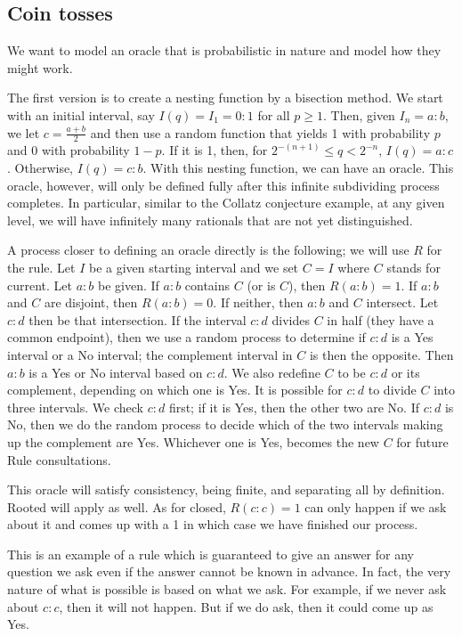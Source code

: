 \documentclass[12pt]{article}
\theoremstyle{remark}
\begin{document}
\subsection{Coin tosses}

We want to model an oracle that is probabilistic in nature and model how they might work. 

The first version is to create a nesting function by a bisection method. We start with an initial interval, say $I(q) = I_1 = 0:1$ for all $p\geq 1$. Then, given $I_n = a:b$, we let $c = \tfrac{a+b}{2}$ and then use a random function that yields 1 with probability $p$ and 0 with probability $1-p$. If it is 1, then, for $2^{-(n+1)} \leq q  < 2^{-n}$, $I(q) = a:c$. Otherwise, $I(q) = c:b$. With this nesting function, we can have an oracle. This oracle, however, will only be defined fully after this infinite subdividing process completes. In particular, similar to the Collatz conjecture example, at any given level, we will have infinitely many rationals that are not yet distinguished.  

A process closer to defining an oracle directly is the following; we will use $R$ for the rule. Let $I$ be a given starting interval and we set $C=I$ where $C$ stands for current. Let $a:b$ be given. If $a:b$ contains $C$ (or is $C$), then $R(a:b) = 1$. If $a:b$ and $C$ are disjoint, then $R(a:b) = 0$. If neither, then $a:b$ and $C$ intersect. Let $c:d$ then be that intersection. If the interval $c:d$ divides $C$ in half (they have a common endpoint), then we use a random process to determine if $c:d$ is a Yes interval or a No interval; the complement interval in $C$ is then the opposite. Then $a:b$ is a Yes or No interval based on $c:d$. We also redefine $C$ to be $c:d$ or its complement, depending on which one is Yes. It is possible for $c:d$ to divide $C$ into three intervals. We check $c:d$ first; if it is Yes, then the other two are No. If $c:d$ is No, then we do the random process to decide which of the two intervals making up the complement are Yes. Whichever one is Yes, becomes the new $C$ for future Rule consultations.  

This oracle will satisfy consistency, being finite, and separating all by definition. Rooted will apply as well. As for closed, $R(c:c)=1$ can only happen if we ask about it and comes up with a 1 in which case we have finished our process. 

This is an example of a rule which is guaranteed to give an answer for any question we ask even if the answer cannot be known in advance. In fact, the very nature of what is possible is based on what we ask. For example, if we never ask about  $c:c$, then it will not happen. But if we do ask, then it could come up as Yes. 
\end{document}

